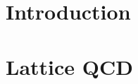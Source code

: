 \documentclass[12pt]{report}
\begin{document}
\onehalfspace




\tableofcontents

\chapter{Introduction}\label{ch:introduction}


\chapter{Lattice QCD}\label{ch:latticeqcd}

\end{document}
